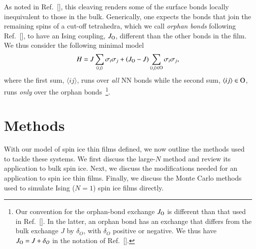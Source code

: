 \documentclass[aps,prx,reprint,runinaddress,superscriptaddress,amsmath,amssymb,floatfix,longbibliography]{revtex4-1}
\newcommand{\Jo}{J_{\rm O}}
\begin{document}
As noted in Ref.~[], this cleaving renders some of the surface bonds locally inequivalent to those in the bulk. Generically, one expects the bonds that join the remaining spins of a cut-off tetrahedra, which we call \emph{orphan bonds} following Ref.~[], to have an Ising coupling, $\Jo$, different than the other bonds in the film. We thus consider the following minimal model
%
\begin{align}
	H = J \sum_{\langle ij\rangle} \sigma_i \sigma_j + (\Jo-J) \sum_{\langle ij\rangle {\in \text{O}}} \sigma_i \sigma_j,
	\label{eq:Hnn_Ising_orphan}
\end{align}
%
where the first sum, $\langle ij \rangle$, runs over \emph{all} \ac{NN} bonds while the second sum, $\langle ij \rangle \in {\rm O}$, runs  \emph{only} over the orphan bonds~\footnote{Our convention for the orphan-bond exchange $\Jo$ is different than that used in  Ref.~[]. In the latter, an orphan bond has an exchange that differs from the bulk exchange $J$ by $\delta_O$, with $\delta_O$ positive or negative. We thus have $\Jo=J+\delta_O$ in the notation of  Ref.~[].}.

\section{Methods}
\label{sec:methods}
With our model of spin ice thin films defined, we now outline the methods used to tackle these systems. We first discuss the large-$N$ method and review its application to bulk spin ice. Next, we discuss the modifications needed for an application to spin ice thin films. Finally, we discuss the Monte Carlo methods used to simulate Ising ($N=1$) spin ice films directly.
\end{document}

